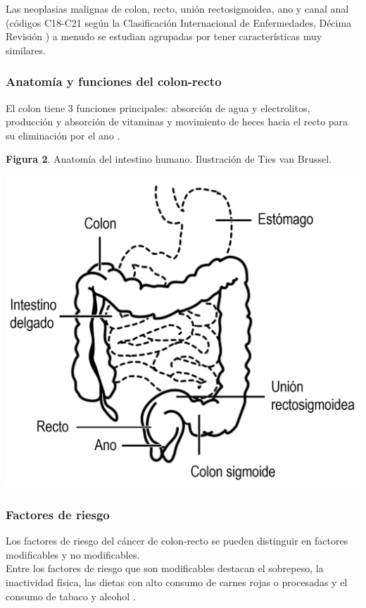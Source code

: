 Las neoplasias malignas de colon, recto, unión rectosigmoidea, ano y canal anal (códigos C18-C21 según la Clasificación Internacional de Enfermedades, Décima Revisión \cite{ICD10, cie10es}) a menudo se estudian agrupadas por tener características muy similares.

\subsubsection{Anatomía y funciones del colon-recto}

El colon tiene 3 funciones principales: absorción de agua y electrolitos, producción y absorción de vitaminas y movimiento de heces hacia el recto para su eliminación por el ano \cite{Azzouz2020}.\\

\begin{center}
	\textbf{Figura 2}. Anatomía del intestino humano. Ilustración de Ties van Brussel.
\end{center}
\begin{center}
	\includegraphics[width=.70\textwidth]{figuras/02_anatomia_cr.png} \\
\end{center}

\subsubsection{Factores de riesgo}

Los factores de riesgo del cáncer de colon-recto  se pueden distinguir en factores modificables y no modificables.\\

Entre los factores de riesgo que son modificables destacan el sobrepeso, la inactividad física, las dietas con alto consumo de carnes rojas o procesadas y el consumo de tabaco y alcohol \cite{AmericanCancerSociety2020}.\\

